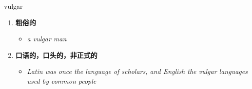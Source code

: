 
\begin{frame}
{\huge vulgar}
\begin{center}
\begin{enumerate}\Large
  \item \textbf{粗俗的}
  \begin{itemize}
    \item \em{\Large{a vulgar man}}
  \end{itemize}
  \item \textbf{口语的，口头的，非正式的}
  \begin{itemize}
    \item \em{\Large{Latin was once the language of scholars, and English the vulgar languages used by common people}}
  \end{itemize}
\end{enumerate}
\end{center}
\end{frame}
